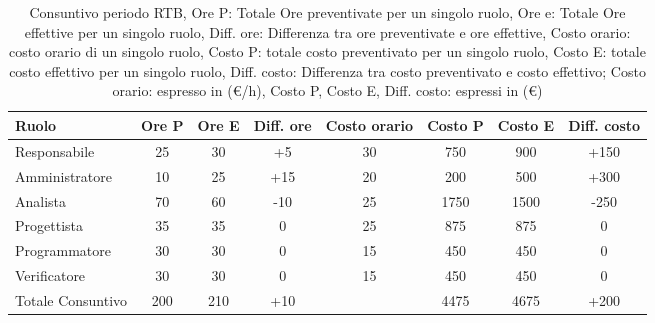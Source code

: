 \begin{table}[H]
	\centering
	\begin{tabular}{l|c|c|c|c|c|c|c}
		\textbf{Ruolo}         & \textbf{Ore P} & \textbf{Ore E} & \textbf{Diff. ore} & \textbf{Costo orario} & \textbf{Costo P} &\textbf{Costo E} & \textbf{Diff. costo}  \\
		\hline
		Responsabile            & 25                     & 30             & +5                    & 30                   & 750           & 900                     & +150              \\
		Amministratore          & 10                     & 25             & +15                   & 20                   & 200           & 500                     & +300              \\
		Analista                & 70                     & 60             & -10                   & 25                   & 1750           & 1500                   & -250              \\
		Progettista             & 35                     & 35             & 0                     & 25                   & 875           & 875                     & 0              \\
		Programmatore           & 30                     & 30             & 0                     & 15                   & 450           & 450                     & 0              \\
		Verificatore            & 30                     & 30             & 0                     & 15                   & 450           & 450                     & 0              \\
        \hline
        Totale Consuntivo       & 200                    & 210            & +10                   &                      & 4475          & 4675                    & +200              \\
		\hline
	\end{tabular}
	\caption{Consuntivo periodo RTB, Ore P: Totale Ore preventivate per un singolo ruolo, Ore e: Totale Ore effettive per un singolo ruolo, 
            Diff. ore: Differenza tra ore preventivate e ore effettive, Costo orario: costo orario di un singolo ruolo, Costo P: totale costo preventivato per un singolo ruolo, 
            Costo E: totale costo effettivo per un singolo ruolo,  Diff. costo: Differenza tra costo preventivato e costo effettivo;
            Costo orario: espresso in (\euro/h), Costo P, Costo E, Diff. costo: espressi in (\euro)}  
\end{table}


